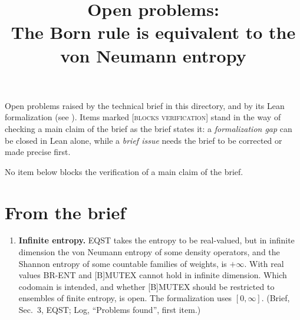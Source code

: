 \documentclass[11pt]{article}
\title{Open problems:\\ The Born rule is equivalent to the von Neumann entropy}
\author{}
\date{}
\begin{document}
\maketitle

\noindent
Open problems raised by the technical brief in this directory, and by its Lean formalization
(see ).
Items marked \textsc{[blocks verification]} stand in the way of checking a main
claim of the brief as the brief states it: a \emph{formalization gap} can be closed
in Lean alone, while a \emph{brief issue} needs the brief to be corrected or made
precise first.

No item below blocks the verification of a main claim of the brief.

\section*{From the brief}
\begin{enumerate}
\item \textbf{Infinite entropy.} EQST takes the entropy to be real-valued, but in infinite
  dimension the von Neumann entropy of some density operators, and the Shannon entropy of some
  countable families of weights, is $+\infty$. With real values BR-ENT and [B]MUTEX cannot hold
  in infinite dimension. Which codomain is intended, and whether [B]MUTEX should be restricted to
  ensembles of finite entropy, is open. The formalization uses $[0, \infty]$. (Brief, Sec.~3,
  EQST; Log, ``Problems found'', first item.)
\end{enumerate}
\end{document}
